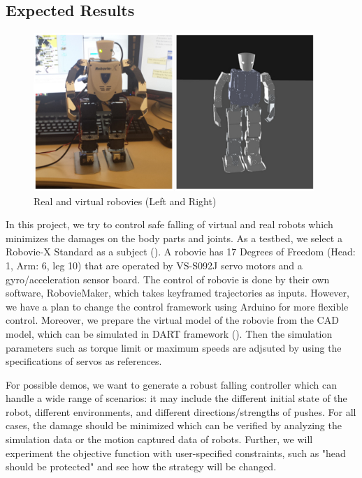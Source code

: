 \subsection{Expected Results}

\begin{figure}[htbp]
\center
  \includegraphics[width=4.2in]{images/falling2_robovies}
  \caption{Real and virtual robovies (Left and Right)} 
 \label{fig:robovies}
\end{figure}

In this project, we try to control safe falling of virtual and real robots
which minimizes the damages on the body parts and joints.
As a testbed, we select a Robovie-X Standard \cite{Robovie} as a subject
().
A robovie has 17 Degrees of Freedom (Head: 1, Arm: 6, leg 10) 
that are operated by VS-S092J servo motors and a gyro/acceleration sensor board.
The control of robovie is done by their own software, RobovieMaker, 
which takes keyframed trajectories as inputs.
However, we have a plan to change the control framework using Arduino 
for more flexible control.
Moreover, we prepare the virtual model of the robovie from the CAD model,
which can be simulated in DART framework \cite{Dart} ().
Then the simulation parameters such as torque limit or maximum speeds are 
adjsuted by using the specifications of servos as references.

For possible demos, we want to generate a robust falling controller 
which can handle a wide range of scenarios:
it may include the different initial state of the robot, different environments, 
and different directions/strengths of pushes.
For all cases, the damage should be minimized which can be verified by 
analyzing the simulation data or the motion captured data of robots.
Further, we will experiment the objective function with user-specified constraints, 
such as "head should be protected" and see how the strategy will be changed.





